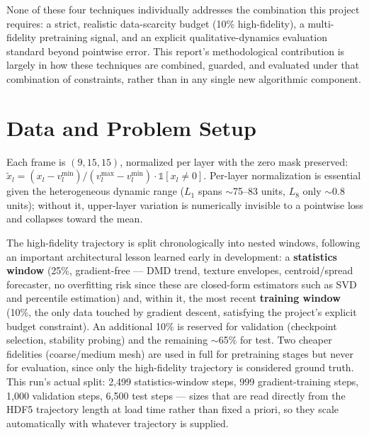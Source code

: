 \documentclass[11pt]{article}
\begin{document}
None of these four techniques individually addresses the combination this project requires: a strict, realistic data-scarcity budget (10\% high-fidelity), a multi-fidelity pretraining signal, and an explicit qualitative-dynamics evaluation standard beyond pointwise error. This report's methodological contribution is largely in how these techniques are combined, guarded, and evaluated under that combination of constraints, rather than in any single new algorithmic component.

\section{Data and Problem Setup}
Each frame is $(9,15,15)$, normalized per layer with the zero mask preserved: $\tilde{x}_l = (x_l - v^{\min}_l)/(v^{\max}_l - v^{\min}_l)\cdot\mathbb{1}[x_l\neq0]$. Per-layer normalization is essential given the heterogeneous dynamic range ($L_1$ spans $\sim$75--83 units, $L_8$ only $\sim$0.8 units); without it, upper-layer variation is numerically invisible to a pointwise loss and collapses toward the mean.

The high-fidelity trajectory is split chronologically into nested windows, following an important architectural lesson learned early in development: a \textbf{statistics window} (25\%, gradient-free — DMD trend, texture envelopes, centroid/spread forecaster, no overfitting risk since these are closed-form estimators such as SVD and percentile estimation) and, within it, the most recent \textbf{training window} (10\%, the only data touched by gradient descent, satisfying the project's explicit budget constraint). An additional 10\% is reserved for validation (checkpoint selection, stability probing) and the remaining $\sim$65\% for test. Two cheaper fidelities (coarse/medium mesh) are used in full for pretraining stages but never for evaluation, since only the high-fidelity trajectory is considered ground truth. This run's actual split: 2{,}499 statistics-window steps, 999 gradient-training steps, 1{,}000 validation steps, 6{,}500 test steps — sizes that are read directly from the HDF5 trajectory length at load time rather than fixed a priori, so they scale automatically with whatever trajectory is supplied.

\end{document}
